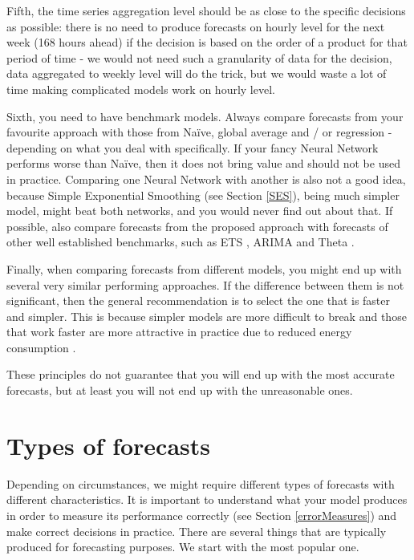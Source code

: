 \documentclass[
]{book}
\theoremstyle{definition}
\theoremstyle{definition}
\theoremstyle{definition}
\theoremstyle{definition}
\theoremstyle{remark}
\begin{document}
Fifth, the time series aggregation level should be as close to the specific decisions as possible: there is no need to produce forecasts on hourly level for the next week (168 hours ahead) if the decision is based on the order of a product for that period of time - we would not need such a granularity of data for the decision, data aggregated to weekly level will do the trick, but we would waste a lot of time making complicated models work on hourly level.

Sixth, you need to have benchmark models. Always compare forecasts from your favourite approach with those from Naïve, global average and / or regression - depending on what you deal with specifically. If your fancy Neural Network performs worse than Naïve, then it does not bring value and should not be used in practice. Comparing one Neural Network with another is also not a good idea, because Simple Exponential Smoothing (see Section \ref{SES}), being much simpler model, might beat both networks, and you would never find out about that. If possible, also compare forecasts from the proposed approach with forecasts of other well established benchmarks, such as ETS \citep{Hyndman2008b}, ARIMA \citep{Box1976} and Theta \citep{Assimakopoulos2000}.

Finally, when comparing forecasts from different models, you might end up with several very similar performing approaches. If the difference between them is not significant, then the general recommendation is to select the one that is faster and simpler. This is because simpler models are more difficult to break and those that work faster are more attractive in practice due to reduced energy consumption \citep[save the planet and stop global warming!][]{Dhar2020}.

These principles do not guarantee that you will end up with the most accurate forecasts, but at least you will not end up with the unreasonable ones.

\hypertarget{typesOfForecasts}{%
\section{Types of forecasts}\label{typesOfForecasts}}

Depending on circumstances, we might require different types of forecasts with different characteristics. It is important to understand what your model produces in order to measure its performance correctly (see Section \ref{errorMeasures}) and make correct decisions in practice. There are several things that are typically produced for forecasting purposes. We start with the most popular one.
\end{document}

